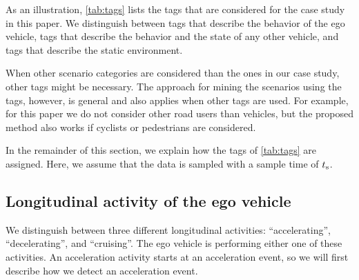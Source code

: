 \cstarta
As an illustration, \cref{tab:tags} lists the tags that are considered for the case study in this paper. 
We distinguish between tags that describe the behavior of the ego vehicle, tags that describe the behavior and the state of any other vehicle, and tags that describe the static environment. \cenda
\begin{remark}
	\cstarta When other scenario categories are considered than the ones in our case study, other tags might be necessary. The approach for mining the scenarios using the tags, however, is general and also applies when other tags are used. \cenda 
	\cstartc For example, for this paper we do not consider other road users than vehicles, but the proposed method also works if cyclists or pedestrians are considered.\cendc
\end{remark}

In the remainder of this section, we explain how the tags of \cref{tab:tags} are assigned. 
Here, we assume that the data is sampled with a sample time of $t_\mathrm{s}$.



\subsection{Longitudinal activity of the ego vehicle}
\label{sec:longitudinal ego}

We distinguish between three different longitudinal activities: ``accelerating'', ``decelerating'', and ``cruising''. 
The ego vehicle is performing either one of these activities. 
\cstartc An acceleration activity starts at an acceleration event, so we will first describe how we detect an acceleration event.
\cendc

